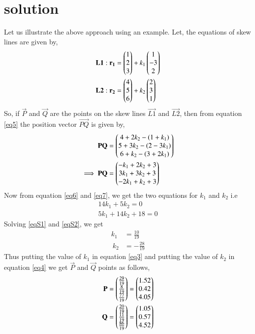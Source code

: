 \documentclass[journal,12pt,twocolumn]{IEEEtran}
\begin{document}
\section{solution}
Let us illustrate the above approach using an example. Let, the equations of skew lines are given by,
\begin{align}
\mathbf{L1}: \mathbf{r_1}&=\begin{pmatrix}1\\2\\3\end{pmatrix}+k_1\begin{pmatrix}1\\-3\\2\end{pmatrix}\label{eqL1}\\
\mathbf{L2}: \mathbf{r_2}&=\begin{pmatrix}4\\5\\6\end{pmatrix}+k_2\begin{pmatrix}2\\3\\1\end{pmatrix}\label{eqL2}
\end{align} 
So, if $\vec{P}$ and $\vec{Q}$ are the points on the skew lines $\vec{L1}$ and $\vec{L2}$, then from equation \ref{eq5} the position vector $\vec{PQ}$ is given by,
\begin{align}
\mathbf{PQ}&=\begin{pmatrix}4+2k_2-(1+k_1)\\5+3k_2-(2-3k_1)\\6+k_2-(3+2k_1)\end{pmatrix}\\
\implies\mathbf{PQ}&=\begin{pmatrix}-k_1+2k_2+3\\3k_1+3k_2+3\\-2k_1+k_2+3\end{pmatrix}
\end{align}
Now from equation \ref{eq6} and \ref{eq7}, we get the two equations for $k_1$ and $k_2$ i.e
\begin{align}
14k_1+5k_2=0\label{eqS1}\\
5k_1+14k_2+18=0\label{eqS2}
\end{align}
Solving \ref{eqS1} and \ref{eqS2}, we get 
\begin{align}
k_1&= \frac{10}{19}\\\
k_2&= -\frac{28}{19}    
\end{align}
Thus putting the value of $k_1$ in equation \ref{eq3} and putting the value of $k_2$ in equation \ref{eq4} we get $\vec{P}$ and $\vec{Q}$ points as follows,
\begin{align}
\mathbf{P}&=\begin{pmatrix}\frac{29}{19}\\\frac{8}{19}\\\frac{77}{19}\end{pmatrix}=\begin{pmatrix}1.52\\0.42\\4.05\end{pmatrix}\\
\mathbf{Q}&=\begin{pmatrix}\frac{20}{19}\\\frac{11}{19}\\\frac{86}{19}\end{pmatrix}=\begin{pmatrix}1.05\\0.57\\4.52\end{pmatrix}
\end{align}
\end{document}
